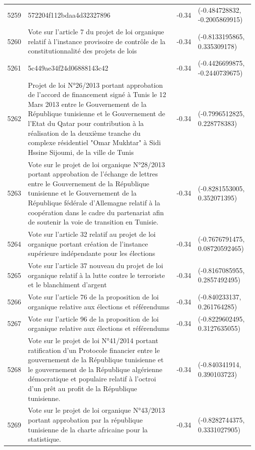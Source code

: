 \begin{table}[ht]
\begin{tabular}{rlrl}
  5259 & 572204f112bdaa4d32327896 & -0.34 & (-0.484728832, -0.2005869915) \\ 
  5260 & Vote sur l'article 7 du projet de loi organique relatif à l'instance provisoire de contrôle de la constitutionnalité des projets de lois & -0.34 & (-0.8133195865, 0.335309178) \\ 
  5261 & 5c449ae34f24d06888143c42 & -0.34 & (-0.4426699875, -0.2440739675) \\ 
  5262 & Projet de loi N°26/2013 portant approbation de l'accord de financement signé à Tunis le 12 Mars 2013 entre le Gouvernement de la République tunisienne et le Gouvernement de l'Etat du Qatar pour contribution à la réalisation de la deuxième tranche du complexe résidentiel "Omar Mukhtar" à Sidi Hssine Sijoumi, de la ville de Tunis & -0.34 & (-0.7996512825, 0.228778383) \\ 
  5263 & Vote sur le projet de loi organique N°28/2013 portant approbation de l'échange de lettres entre le Gouvernement de la République tunisienne et le Gouvernement de la République fédérale d'Allemagne relatif à la coopération dans le cadre du partenariat afin de soutenir la voie de transition en Tunisie. & -0.34 & (-0.8281553005, 0.352071395) \\ 
  5264 & Vote sur l'article 32 relatif au projet de loi organique portant création de l'instance supérieure indépendante pour les élections & -0.34 & (-0.7676791475, 0.08720592465) \\ 
  5265 & Vote sur l'article 37 nouveau du projet de loi organique relatif à la lutte contre le terroriste et le blanchiment d'argent & -0.34 & (-0.8167085955, 0.2857492495) \\ 
  5266 & Vote sur l'article 76 de la proposition de loi organique relative aux élections et référendums & -0.34 & (-0.840233137, 0.261764285) \\ 
  5267 & Vote sur l'article 96 de la proposition de loi organique relative aux élections et référendums & -0.34 & (-0.8229602495, 0.3127635055) \\ 
  5268 & Vote sur le projet de loi N°41/2014 portant ratification d'un Protocole financier entre le gouvernement de la République tunisienne et le gouvernement de la République algérienne démocratique et populaire relatif à l'octroi d'un prêt au profit de la République tunisienne. & -0.34 & (-0.840341914, 0.390103723) \\ 
  5269 & Vote sur le projet de loi organique N°43/2013 portant approbation par la république tunisienne de la charte africaine pour la statistique. & -0.34 & (-0.8282744375, 0.3331027905) \\ 

\end{tabular}
\end{table}
